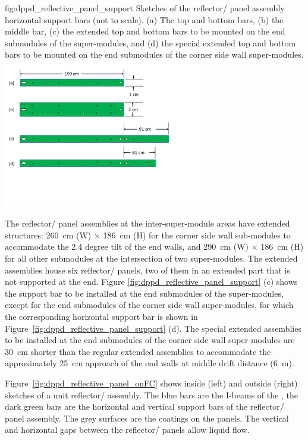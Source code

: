 \begin{dunefigure}{fig:dppd_reflective_panel_support}
{Sketches of the reflector/ panel assembly horizontal support bars (not to scale). (a) The top and bottom bars, (b) the middle bar, (c) the extended top and bottom bars to be mounted on the end submodules of the  super-modules, and (d) the special extended top and bottom bars to be mounted on the end submodules of the corner  side wall super-modules.}
\includegraphics[width=0.65\textwidth]{graphics/dppd_reflective_panel_support}
\end{dunefigure}

The reflector/ panel assemblies at the inter-super-module areas  have extended structures: \SI{260}{\cm} (W) $\times$ \SI{186}{\cm} (H) for the corner side wall  sub-modules to accommodate the \num{2.4} degree tilt of the end walls, and \SI{290}{\cm} (W) $\times$ \SI{186}{\cm} (H) for all other  submodules at the intersection of two  super-modules. The extended assemblies house six reflector/ panels, two of them in an extended part that is not supported at the end. Figure \ref{fig:dppd_reflective_panel_support} (c) shows the support bar to be installed at the end submodules of the  super-modules, except for the end submodules of the corner  side wall super-modules, for which the corresponding horizontal support bar is shown in Figure~\ref{fig:dppd_reflective_panel_support} (d). The special extended assemblies to be installed at the end submodules of the corner side wall super-modules are \SI{30}{\cm} shorter than the regular extended assemblies to accommodate the approximately \SI{25}{\cm} approach of the end walls at middle drift distance (\SI{6}{\m}).

Figure~\ref{fig:dppd_reflective_panel_onFC} shows inside (left) and outside (right) sketches of a unit reflector/ assembly. The blue bars are the I-beams of the , the dark green bars are the horizontal and vertical support bars of the reflector/ panel assembly. The grey surfaces are the  coatings on the panels. The vertical and horizontal gaps between the reflector/ panels allow liquid flow. 

